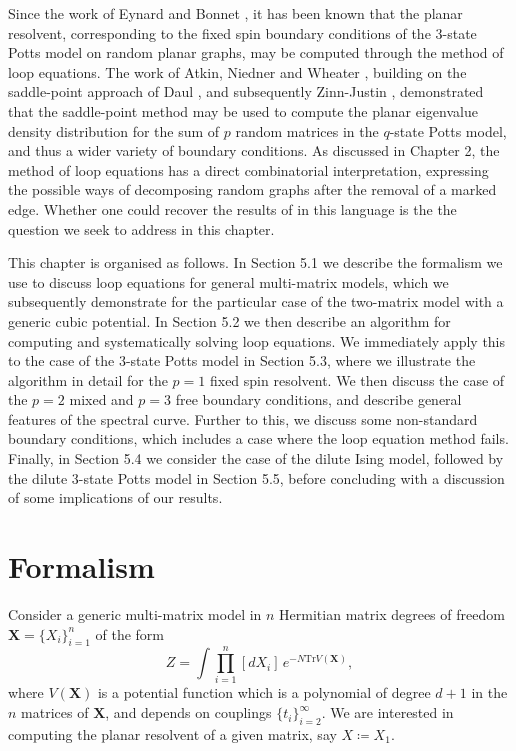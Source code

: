 Since the work of Eynard and Bonnet \cite{Eynard:1999gp}, it has been known that the planar
resolvent, corresponding to the fixed spin boundary conditions of the 3-state Potts model on random
planar graphs, may be computed through the method of loop equations. The work of Atkin, Niedner and
Wheater \cite{Niedner:2016skw}, building on the saddle-point approach of Daul \cite{Daul:1994qy},
and subsequently Zinn-Justin \cite{ZinnJustin:1999jg}, demonstrated that the saddle-point method
may be used to compute the planar eigenvalue density distribution for the sum of $p$ random
matrices in the $q$-state Potts model, and thus a wider variety of boundary conditions. As
discussed in Chapter 2, the method of loop equations has a direct combinatorial interpretation,
expressing the possible ways of decomposing random graphs after the removal of a marked edge.
Whether one could recover the results of \cite{Niedner:2016skw} in this language is the the
question we seek to address in this chapter.

This chapter is organised as follows. In Section 5.1 we describe the formalism we use to discuss
loop equations for general multi-matrix models, which we subsequently demonstrate for the
particular case of the two-matrix model with a generic cubic potential. In Section 5.2 we then
describe an algorithm for computing and systematically solving loop equations. We immediately apply
this to the case of the 3-state Potts model in Section 5.3, where we illustrate the algorithm in
detail for the $p=1$ fixed spin resolvent. We then discuss the case of the $p=2$ mixed and $p=3$
free boundary conditions, and describe general features of the spectral curve. Further to this, we
discuss some non-standard boundary conditions, which includes a case where the loop equation method
fails. Finally, in Section 5.4 we consider the case of the dilute Ising model, followed by the
dilute 3-state Potts model in Section 5.5, before concluding with a discussion of some implications
of our results.

\section{Formalism}

Consider a generic multi-matrix model in $n$ Hermitian matrix degrees of freedom
$\mathbf{X}=\{X_i\}_{i=1}^n$ of the form
%
\begin{equation}
    \label{loops1}
    Z = \int \prod_{i=1}^n [dX_i] \, e^{-N\text{Tr}V(\mathbf{X})},
\end{equation}
%
where $V(\mathbf{X})$ is a potential function which is a polynomial of degree $d+1$ in the $n$
matrices of $\mathbf{X}$, and depends on couplings $\{t_i\}_{i=2}^{\infty}$. We are interested in
computing the planar resolvent of a given matrix, say $X \coloneqq X_1$.

